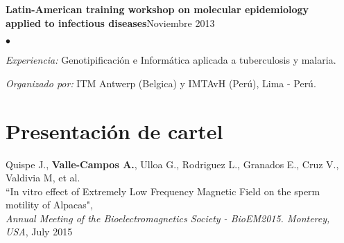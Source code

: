 \documentclass[margin,line]{res}
\newenvironment{list2}{
	\begin{list}{$\bullet$}{%
			\setlength{\itemsep}{0in}
			\setlength{\parsep}{0in} \setlength{\parskip}{0in}
			\setlength{\topsep}{0in} \setlength{\partopsep}{0in}
			\setlength{\leftmargin}{0.2in}}}{\end{list}}
\begin{document}
\begin{resume}
		
		
		
		{\bf Latin-American training workshop on molecular epidemiology \\applied to infectious diseases}\hfill {Noviembre 2013}\\
		\vspace*{-.1in}%
		\begin{list2} %
			\item \textit{Experiencia:} Genotipificación e Informática aplicada a tuberculosis y malaria. %
			\item \textit{Organizado por:} ITM Antwerp (Belgica) y IMTAvH (Perú), Lima - Perú.\\
		\end{list2}
		
		
		
		\section{\sc Presentación de cartel}
		
		Quispe J., \textbf{Valle-Campos A.}, Ulloa G., Rodriguez L., Granados E., Cruz V., Valdivia M, et al.\\ ``In vitro effect of Extremely Low Frequency Magnetic Field on the sperm motility of Alpacas", \\ {\em Annual Meeting of the Bioelectromagnetics Society - BioEM2015. Monterey, USA}, July 2015\\
		

\end{resume}
\end{document}
